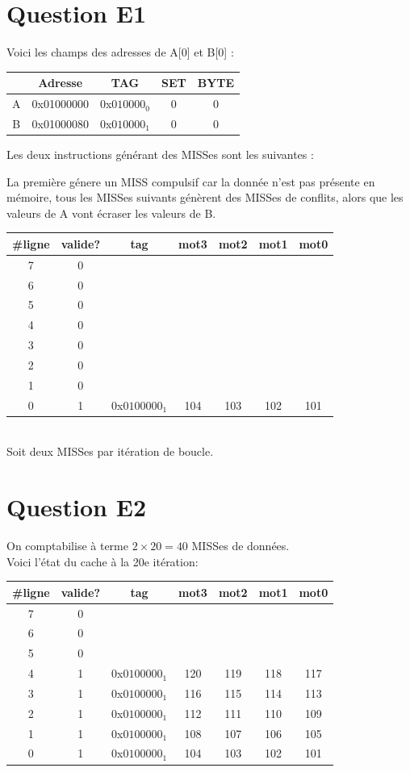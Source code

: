 \documentclass[10pt]{article}
\begin{document}
\section{Question E1}
Voici les champs des adresses de A[0] et B[0] :
\begin{tabular}{|c|c|c|c|c|}
  \hline
 & Adresse & TAG & SET & BYTE \\ \hline
 A & 0x01000000 & 0x$010000_0$ & 0 & 0 \\ \hline
 B & 0x01000080 & 0x$010000_1$ & 0 & 0 \\ \hline
\end{tabular}
Les deux instructions générant des MISSes sont les suivantes :

La première génere un MISS compulsif car la donnée n'est pas présente en
mémoire, tous les MISSes suivants génèrent des MISSes de conflits, alors que
les valeurs de A vont écraser les valeurs de B.\\
\begin{tabular}{|c|c|c|c|c|c|c|}
  \hline
  \#ligne & valide? & tag & mot3 & mot2 & mot1 & mot0 \\ \hline
  7 & 0 & & & & & \\ \hline
  6 & 0 & & & & & \\ \hline
  5 & 0 & & & & & \\ \hline
  4 & 0 & & & & & \\ \hline
  3 & 0 & & & & & \\ \hline
  2 & 0 & & & & & \\ \hline
  1 & 0 & & & & & \\ \hline
  0 & 1 & 0x$0100000_1$ & 104 & 103 & 102 & 101 \\ \hline
\end{tabular}\\
Soit deux MISSes par itération de boucle.

\section{Question E2}
On comptabilise à terme ${2}\times{20}={40}$ MISSes de données.\\Voici l'état du
cache à la 20e itération:\\
\begin{tabular}{|c|c|c|c|c|c|c|}
  \hline
  \#ligne & valide? & tag & mot3 & mot2 & mot1 & mot0 \\ \hline
  7 & 0 & & & & & \\ \hline
  6 & 0 & & & & & \\ \hline
  5 & 0 & & & & & \\ \hline
  4 & 1 & 0x$0100000_1$ & 120 & 119 & 118 & 117 \\ \hline
  3 & 1 & 0x$0100000_1$ & 116 & 115 & 114 & 113 \\ \hline
  2 & 1 & 0x$0100000_1$ & 112 & 111 & 110 & 109 \\ \hline
  1 & 1 & 0x$0100000_1$ & 108 & 107 & 106 & 105 \\ \hline
  0 & 1 & 0x$0100000_1$ & 104 & 103 & 102 & 101 \\ \hline
\end{tabular}
\end{document}
